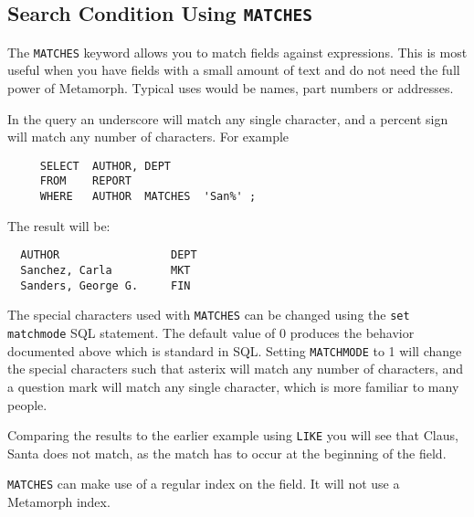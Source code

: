 \subsection{Search Condition Using {\tt MATCHES}}

The {\tt MATCHES} keyword allows you to match fields against expressions.  This
is most useful when you have fields with a small amount of text and do not
need the full power of Metamorph.  Typical uses would be names, part numbers
or addresses.

In the query an underscore will match any single character, and a percent
sign will match any number of characters.  For example

\begin{verbatim}
     SELECT  AUTHOR, DEPT
     FROM    REPORT
     WHERE   AUTHOR  MATCHES  'San%' ;
\end{verbatim}
The result will be:
\begin{screen}
\begin{verbatim}
  AUTHOR                 DEPT
  Sanchez, Carla         MKT
  Sanders, George G.     FIN
\end{verbatim}
\end{screen}

The special characters used with {\tt MATCHES} can be changed using the
{\tt set matchmode} SQL statement.  The default value of 0 produces
the behavior documented above which is standard in SQL.  Setting
\verb|MATCHMODE| to 1 will change the special characters such that
asterix will match any number of characters, and a question mark will
match any single character, which is more familiar to many people.

Comparing the results to the earlier example using \verb`LIKE` you will see that
Claus, Santa does not match, as the match has to occur at the beginning of
the field.

{\tt MATCHES} can make use of a regular index on the field.  It will not use
a Metamorph index.

